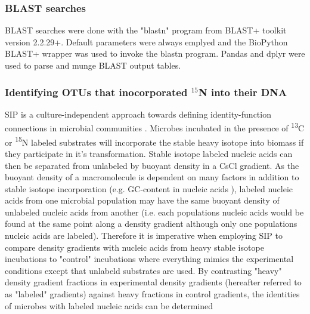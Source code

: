 \subsubsection{BLAST searches}
BLAST searches were done with the "blastn" program from BLAST+ toolkit \cite{20003500} version 2.2.29+. Default parameters were always emplyed and the BioPython \cite{19304878} BLAST+ wrapper was used to invoke the blastn program. Pandas \cite{citeulike:11241428} and dplyr \cite{dplyr} were used to parse and munge BLAST output tables.  

\subsubsection{Identifying OTUs that inocorporated $^{15}$N into their DNA}
SIP is a culture-independent approach towards defining identity-function
connections in microbial communities \cite{Buckley_2011, 17446886}. Microbes
incubated in the presence of \textsuperscript{13}C or \textsuperscript{15}N
labeled substrates will incorporate the stable heavy isotope into biomass if
they participate in it's transformation.  Stable isotope labeled nucleic acids
can then be separated from unlabeled by buoyant density in a CsCl gradient. As
the buoyant density of a macromolecule is dependent on many factors in addition
to stable isotope incorporation (e.g.  GC-content in nucleic acids
\cite{25139123}), labeled nucleic acids from one microbial population may have
the same buoyant density of unlabeled nucleic acids from another (i.e.  each
populations nucleic acids would be found at the same point along a density
gradient although only one populations nucleic acids are labeled). Therefore it
is imperative when employing SIP to compare density gradients with nucleic
acids from heavy stable isotope incubations to "control" incubations where
everything mimics the experimental conditions except that unlabeld substrates
are used. By contrasting "heavy" density gradient fractions in experimental
density gradients (hereafter referred to as "labeled" gradients) against heavy
fractions in control gradients, the identities of microbes with labeled nucleic
acids can be determined 

